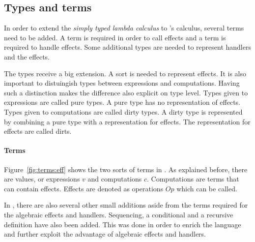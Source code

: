 \subsection{Types and terms}
In order to extend the \textit{simply typed lambda calculus} to \eff's calculus, several terms need to be added. A term is required in order to call effects and a term is required to handle effects. Some additional types are needed to represent handlers and the effects. \cite{pretnar2015introduction}

The types receive a big extension. A sort is needed to represent effects. It is also important to distuingish types between expressions and computations. Having such a distinction makes the difference also explicit on type level. Types given to expressions are called pure types. A pure type has no representation of effects. Types given to computations are called dirty types. A dirty type is represented by combining a pure type with a representation for effects. The representation for effects are called dirts.  

\paragraph{Terms}
Figure~\ref{fig:terms:eff} shows the two sorts of terms in \eff. As explained before, there are values, or expressions $v$ and computations $c$. Computations are terms that can contain effects. Effects are denoted as operations $Op$ which can be called. \cite{handling}

In \eff, there are also several other small additions aside from the terms required for the algebraic effects and handlers. Sequencing, a conditional and a recursive definition have also been added. This was done in order to enrich the language and further exploit the advantage of algebraic effects and handlers. \cite{programming}


